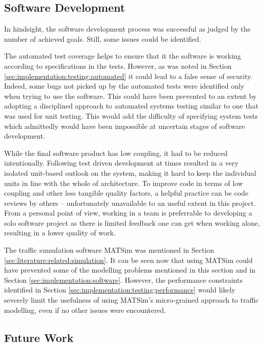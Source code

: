 \subsection{Software Development}

In hindsight, the software development process was successful as judged by the
number of achieved goals. Still, some issues could be identified.

The automated test coverage helps to ensure that it the software is working
according to specifications in the tests. However, as was noted in Section
\ref{sec:implementation:testing:automated} it could lead to a false sense of
security. Indeed, some bugs not picked up by the automated tests were
identified only when trying to use the software. This could have been prevented
to an extent by adopting a disciplined approach to automated systems testing
similar to one that was used for unit testing. This would add the difficulty of
specifying system tests which admittedly would have been impossible at
uncertain stages of software development.

While the final software product has low coupling, it had to be reduced
intentionally. Following test driven development at times resulted in a very
isolated unit-based outlook on the system, making it hard to keep the
individual units in line with the whole of architecture. To improve code in
terms of low coupling and other less tangible quality factors, a helpful
practice can be code reviews by others -- unfortunately unavailable to an
useful extent in this project. From a personal point of view, working in a team
is preferrable to developing a solo software project as there is limited
feedback one can get when working alone, resulting in a lower quality of work.

The traffic sumulation software MATSim was mentioned in Section
\ref{sec:literature:related:simulation}. It can be seen now that using MATSim
could have prevented some of the modelling problems mentioned in this section
and in Section \ref{sec:implementation:software}. However, the performance
constraints identified in Section \ref{sec:implementation:testing:performance}
would likely severely limit the usefulness of using MATSim's micro-grained
approach to traffic modelling, even if no other issues were encountered.


\subsection{Future Work}

